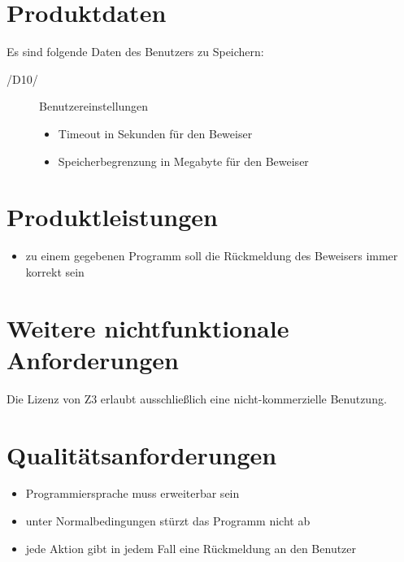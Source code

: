 \documentclass[a4paper,10pt]{article}
\begin{document}
\section{Produktdaten}
Es sind folgende Daten des Benutzers zu Speichern:
\begin{description}
\item[/D10/] Benutzereinstellungen
\begin{itemize}
  \item Timeout in Sekunden für den Beweiser
  \item Speicherbegrenzung in Megabyte für den Beweiser
\end{itemize}
\end{description}

\section{Produktleistungen}
\begin{itemize}
  \item zu einem gegebenen Programm soll die Rückmeldung des Beweisers immer
  korrekt sein
\end{itemize}

\section{Weitere nichtfunktionale Anforderungen}
Die Lizenz von Z3 erlaubt ausschließlich eine nicht-kommerzielle Benutzung.

\section{Qualitätsanforderungen}
\begin{itemize}
  \item Programmiersprache muss erweiterbar sein
  \item unter Normalbedingungen stürzt das Programm nicht ab
  \item jede Aktion gibt in jedem Fall eine Rückmeldung an den Benutzer
\end{itemize}
\end{document}
